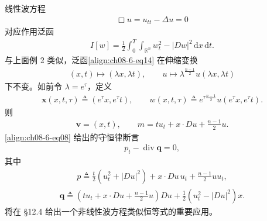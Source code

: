 \documentclass[../../main.tex]{subfiles}
\begin{document}
\begin{example}[波方程的伸缩不变性]\label{example:ch08-6-4-波方程伸缩}
线性波方程
\begin{align*}
\Box u=u_{tt}-\Delta u=0
\end{align*}
对应作用泛函
\begin{align}
I[w]=\frac12\int_0^T\int_{\mathbb{R}^n}w_t^2-|Dw|^2\,\mathrm{d}x\,\mathrm{d}t.\label{align:ch08-6-eq14}
\end{align}
与上面例 2 类似，泛函\eqref{align:ch08-6-eq14} 在伸缩变换
\begin{align*}
(x,t)\mapsto(\lambda x,\lambda t),\qquad u\mapsto\lambda^{\frac{n-1}{2}}u(\lambda x,\lambda t)
\end{align*}
下不变。如前令 $\lambda=e^\tau$，定义
\begin{align*}
\mathbf{x}(x,t,\tau)\triangleq(e^\tau x,e^\tau t),\qquad w(x,t,\tau)\triangleq e^{\tau\frac{n-1}{2}}u(e^\tau x,e^\tau t).
\end{align*}
则
\begin{align*}
\mathbf{v}=(x,t),\qquad m=tu_t+x\cdot Du+\frac{n-1}{2}u.
\end{align*}
\eqref{align:ch08-6-eq08} 给出的守恒律断言
\begin{align*}
p_t-\operatorname{div}\mathbf{q}=0,
\end{align*}
其中
\begin{align*}
p\triangleq\frac t2(u_t^2+|Du|^2)+x\cdot Du\,u_t+\frac{n-1}{2}uu_t,
\end{align*}
\begin{align*}
\mathbf{q}\triangleq\left(tu_t+x\cdot Du+\frac{n-1}{2}u\right)Du+\frac12(u_t^2-|Du|^2)x.
\end{align*}
将在 \S12.4 给出一个非线性波方程类似恒等式的重要应用。
\end{example}
\end{document}
